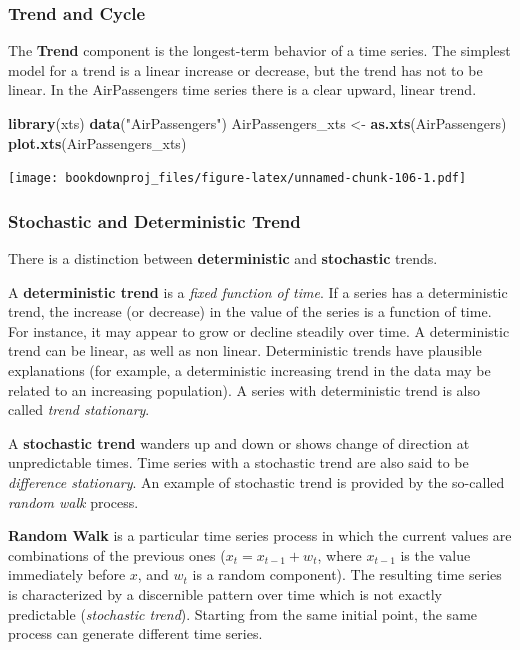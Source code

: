 \documentclass[
]{article}
\newenvironment{Shaded}{\begin{snugshade}}{\end{snugshade}}
\newcommand{\KeywordTok}[1]{\textcolor[rgb]{0.13,0.29,0.53}{\textbf{#1}}}
\newcommand{\NormalTok}[1]{#1}
\newcommand{\StringTok}[1]{\textcolor[rgb]{0.31,0.60,0.02}{#1}}
\begin{document}
\hypertarget{trend-and-cycle}{%
\subsubsection{Trend and Cycle}\label{trend-and-cycle}}

The \textbf{Trend} component is the longest-term behavior of a time series. The simplest model for a trend is a linear increase or decrease, but the trend has not to be linear. In the AirPassengers time series there is a clear upward, linear trend.

\begin{Shaded}
\begin{Highlighting}[]
\KeywordTok{library}\NormalTok{(xts)}
\KeywordTok{data}\NormalTok{(}\StringTok{"AirPassengers"}\NormalTok{)}
\NormalTok{AirPassengers_xts <-}\StringTok{ }\KeywordTok{as.xts}\NormalTok{(AirPassengers)}
\KeywordTok{plot.xts}\NormalTok{(AirPassengers_xts)}
\end{Highlighting}
\end{Shaded}

\texttt{[image: bookdownproj\_files/figure-latex/unnamed-chunk-106-1.pdf]}

\hypertarget{stochastic-and-deterministic-trend}{%
\subsubsection{Stochastic and Deterministic Trend}\label{stochastic-and-deterministic-trend}}

There is a distinction between \textbf{deterministic} and \textbf{stochastic} trends.

A \textbf{deterministic trend} is a \emph{fixed function of time}. If a series has a deterministic trend, the increase (or decrease) in the value of the series is a function of time. For instance, it may appear to grow or decline steadily over time. A deterministic trend can be linear, as well as non linear. Deterministic trends have plausible explanations (for example, a deterministic increasing trend in the data may be related to an increasing population). A series with deterministic trend is also called \emph{trend stationary}.

A \textbf{stochastic trend} wanders up and down or shows change of direction at unpredictable times. Time series with a stochastic trend are also said to be \emph{difference stationary}. An example of stochastic trend is provided by the so-called \emph{random walk} process.

\textbf{Random Walk} is a particular time series process in which the current values are combinations of the previous ones (\(x_t = x_{t-1} + w_t\), where \(x_{t-1}\) is the value immediately before \(x\), and \(w_t\) is a random component). The resulting time series is characterized by a discernible pattern over time which is not exactly predictable (\emph{stochastic trend}). Starting from the same initial point, the same process can generate different time series.
\end{document}
